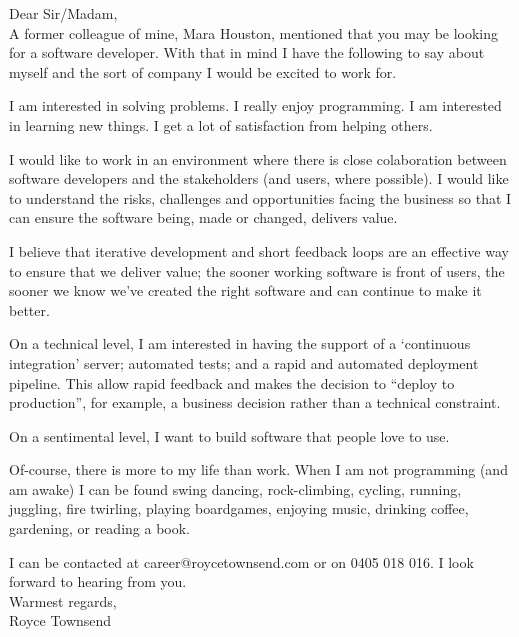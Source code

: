 \documentclass[12pt,a4paper,english]{article}
\begin{document}
Dear Sir/Madam,\\

A former colleague of mine, Mara Houston, mentioned that you may be looking for a software developer. With that in mind I have the following to say about myself and the sort of company I would be excited to work for.

I am interested in solving problems. I really enjoy programming. I am interested in learning new things. I get a lot of satisfaction from helping others.

I would like to work in an environment where there is close colaboration between software developers and the stakeholders (and users, where possible). I would like to understand the risks, challenges and opportunities facing the business so that I can ensure the software being, made or changed, delivers value.

I believe that iterative development and short feedback loops are an effective way to ensure that we deliver value; the sooner working software is front of users, the sooner we know we've created the right software and can continue to make it better.

On a technical level, I am interested in having the support of a `continuous integration' server; automated tests; and a rapid and automated deployment pipeline. This allow rapid feedback and makes the decision to ``deploy to production'', for example, a business decision rather than a technical constraint.

On a sentimental level, I want to build software that people love to use.

Of-course, there is more to my life than work.
When I am not programming (and am awake) I can be found swing dancing, rock-climbing, cycling, running, juggling, fire twirling, playing boardgames, enjoying music, drinking coffee, gardening, or reading a book.

I can be contacted at career@roycetownsend.com or on 0405 018 016. I look forward to hearing from you.
\\

Warmest regards,\\
Royce Townsend
\end{document}
